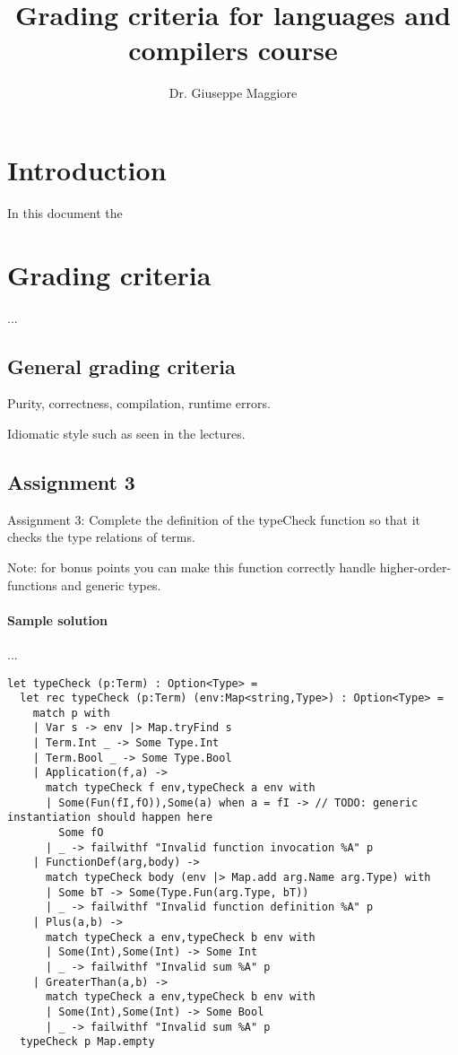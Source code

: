 \documentclass[10pt,a4paper]{article}
\author{Dr. Giuseppe Maggiore}
\title{Grading criteria for languages and compilers course}
\begin{document}
\maketitle

\section{Introduction}
In this document the 

\section{Grading criteria}
...

\subsection{General grading criteria}
Purity, correctness, compilation, runtime errors.

Idiomatic style such as seen in the lectures.

\subsection{Assignment 3}


Assignment 3: Complete the definition of the typeCheck function so that it checks the type relations of terms.

Note: for bonus points you can make this function correctly handle higher-order-functions and generic types.


\paragraph{Sample solution}

...

\begin{lstlisting}
let typeCheck (p:Term) : Option<Type> =
  let rec typeCheck (p:Term) (env:Map<string,Type>) : Option<Type> =
    match p with
    | Var s -> env |> Map.tryFind s
    | Term.Int _ -> Some Type.Int
    | Term.Bool _ -> Some Type.Bool
    | Application(f,a) ->
      match typeCheck f env,typeCheck a env with
      | Some(Fun(fI,fO)),Some(a) when a = fI -> // TODO: generic instantiation should happen here
        Some fO
      | _ -> failwithf "Invalid function invocation %A" p
    | FunctionDef(arg,body) ->
      match typeCheck body (env |> Map.add arg.Name arg.Type) with
      | Some bT -> Some(Type.Fun(arg.Type, bT))
      | _ -> failwithf "Invalid function definition %A" p
    | Plus(a,b) ->
      match typeCheck a env,typeCheck b env with
      | Some(Int),Some(Int) -> Some Int
      | _ -> failwithf "Invalid sum %A" p
    | GreaterThan(a,b) ->
      match typeCheck a env,typeCheck b env with
      | Some(Int),Some(Int) -> Some Bool
      | _ -> failwithf "Invalid sum %A" p
  typeCheck p Map.empty
\end{lstlisting}
\end{document}
